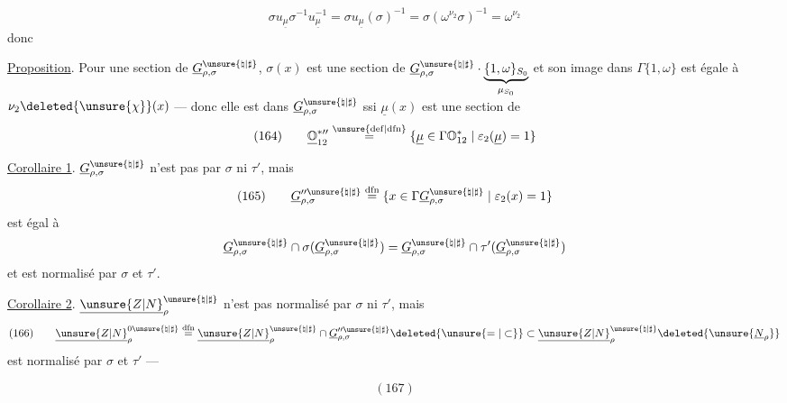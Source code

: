 
\[
\sigma u_{\underline\mu}\sigma^{-1}u_{\underline\mu}^{-1}
=\sigma u_{\underline\mu}(\sigma)^{-1}
=\sigma(\omega^{\nu_2}\sigma)^{-1}=\omega^{\nu_2}
\]
donc

\uline{Proposition}. Pour une section  de $\underline G_{\rho,\sigma}^{\unsure{\natural|\sharp}}$, \deleted{$\unsure{\sigma}$}
$\sigma(x)$ est une section de $\underline G_{\rho,\sigma}^{\unsure{\natural|\sharp}}\cdot\underbrace{\{1,\omega\}_{S_0}}_{\mu_{S_0}}$ et son image dans $\Gamma\{1,\omega\}$ est égale à $\nu_2\deleted{\unsure{\chi}}(x)$ --- donc elle est dans $\underline G_{\rho,\sigma}^{\unsure{\natural|\sharp}}$ ssi $\underline\mu(x)$ est une section de
\[
(164)\qquad
\underline{\mathbb O}_{12}^{*\prime\prime}
\overset{\unsure{\mathrm{def}|\mathrm{dfn}}}{=}
\{\underline\mu\in\Gamma\mathbb O_{12}^*\mid\varepsilon_2(\underline\mu)=1\}
\]

\uline{Corollaire 1}. $\underline G_{\rho,\sigma}^{\unsure{\natural|\sharp}}$ n'est pas  par $\sigma$ ni $\tau'$, mais
\[
(165)\qquad
\underline G_{\rho,\sigma}^{\prime\prime\unsure{\natural|\sharp}}
\overset{\mathrm{dfn}}{=}
\{x\in\Gamma\underline G_{\rho,\sigma}^{\unsure{\natural|\sharp}}\mid\varepsilon_2(x)=1\}
\]
est égal à
\[
\underline G_{\rho,\sigma}^{\unsure{\natural|\sharp}}
\cap\sigma(\underline G_{\rho,\sigma}^{\unsure{\natural|\sharp}})
=\underline G_{\rho,\sigma}^{\unsure{\natural|\sharp}}
\cap\tau'(\underline G_{\rho,\sigma}^{\unsure{\natural|\sharp}})
\]
et est normalisé par $\sigma$ et $\tau'$.

\uline{Corollaire 2}. $\underline{\unsure{Z|N}}_\rho^{\unsure{\natural|\sharp}}$ n'est pas normalisé par $\sigma$ ni $\tau'$, mais
\[
(166)\qquad
\underline{\unsure{Z|N}}_\rho^{0\unsure{\natural|\sharp}}
\overset{\mathrm{dfn}}{=}
\underline{\unsure{Z|N}}_\rho^{\unsure{\natural|\sharp}}
\cap\underline G_{\rho,\sigma}^{\prime\prime\unsure{\natural|\sharp}}
\deleted{\unsure{=|\subset}}
\subset\underline{\unsure{Z|N}}_\rho^{\unsure{\natural|\sharp}}
\deleted{\unsure{\underline N_\rho}}
\]
est normalisé par $\sigma$ et $\tau'$ --- 
\begin{samepage}
\[
(167)
\]
\end{samepage}

